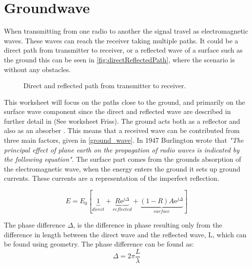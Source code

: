 \chapter{Groundwave}

When transmitting from one radio to another the signal travel as electromagnetic waves. These waves can reach the receiver taking multiple paths. It could be a direct path from transmitter to receiver, or a reflected wave of a surface such as the ground this can be seen in \autoref{fig:directReflectedPath}, where the scenario is without any obstacles. 

\begin{figure}[H]
\centering

\caption{Direct and reflected path from transmitter to receiver.}
\label{fig:directReflectedPath}
\end{figure}

This worksheet will focus on the paths close to the ground, and primarily on the surface wave component since the direct and reflected wave are described in further detail in (See worksheet Friss). The ground acts both as a reflector and also as an absorber \citep{Bullington}. This means that a received wave can be contributed from three main factors, given in \eqref{ground_wave}. In 1947 Burlington wrote that \textit{"The principal effect of plane earth on the propagation of radio waves is indicated by the following equation"}\citep{Bullington}. The surface part comes from the grounds absorption of the electromagnetic wave, when the energy enters the ground it sets up ground currents. These currents are a representation of the imperfect reflection.    

\begin{equation}
E=E_0\left[\underbrace{1}_{direct}+\underbrace{R\text{e}^{j\Delta}}_{reflected}+\underbrace{(1-R)A\text{e}^{j\Delta}}_{surface}\right]
\label{ground_wave}
\end{equation}
\begin{where}
\end{where}

The phase difference $\Delta$, is the difference in phase resulting only from the difference in length between the direct wave and the reflected wave, L, which can be found using geometry. The phase difference can be found as:
\begin{equation}
\Delta =2\pi \frac{L}{\lambda}
\end{equation}
\begin{where}
\end{where}

